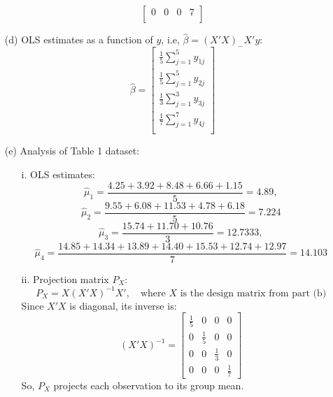 \documentclass[10pt, oneside]{article}
\begin{document}
\begin{itemize}
\[\begin{bmatrix}
      0 & 0 & 0 & 7 \\
    \end{bmatrix}
  \]
  \item[(d)] OLS estimates as a function of $y$, i.e, $\hat{\beta}=(X'X)_-X'y$:
      \[
    \hat{\beta} = \begin{bmatrix}
      \frac{1}{5} \sum_{j=1}^{5} y_{1j} \\
      \frac{1}{5} \sum_{j=1}^{5} y_{2j} \\
      \frac{1}{3} \sum_{j=1}^{3} y_{3j} \\
      \frac{1}{7} \sum_{j=1}^{7} y_{4j} \\
    \end{bmatrix}
  \]
	\item[(e)] Analysis of Table 1 dataset:
	\begin{itemize}
		\item[i.] OLS estimates:
              \[
    \hat{\mu}_1 = \frac{4.25 + 3.92 + 8.48 + 6.66 + 1.15}{5} = 4.89,
  \]
  \[
    \hat{\mu}_2 = \frac{9.55 + 6.08 + 11.53 + 4.78 + 6.18}{5} = 7.224
  \]
  \[
    \hat{\mu}_3 = \frac{15.74 + 11.70 + 10.76}{3} = 12.7333, 
  \]
  \[
    \hat{\mu}_4 = \frac{14.85 + 14.34 + 13.89 + 14.40 + 15.53 + 12.74 + 12.97}{7} = 14.103
  \]
		\item[ii.] Projection matrix $P_X$:
 \[
    P_X = X(X'X)^{-1}X', \quad \text{where } X \text{ is the design matrix from part (b)}
  \]
  Since \(X'X\) is diagonal, its inverse is:
  \[
    (X'X)^{-1} = \begin{bmatrix}
      \frac{1}{5} & 0 & 0 & 0 \\
      0 & \frac{1}{5} & 0 & 0 \\
      0 & 0 & \frac{1}{3} & 0 \\
      0 & 0 & 0 & \frac{1}{7}
    \end{bmatrix}
  \]
  So, \(P_X\) projects each observation to its group mean.


\end{itemize}
\end{itemize}
\end{document}
